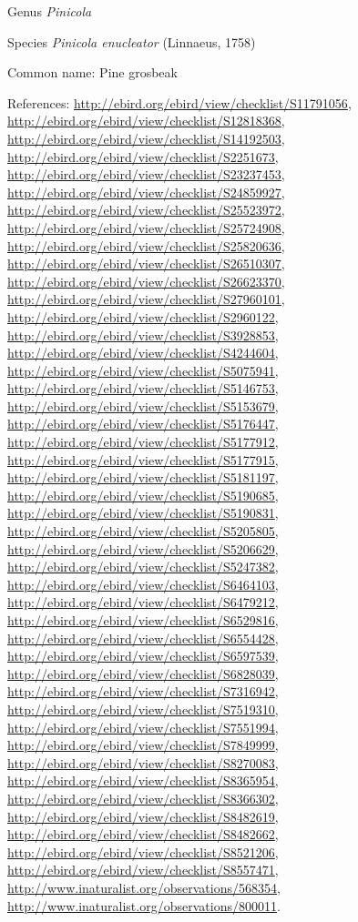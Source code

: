 \documentclass[9pt, article]{memoir}
\begin{document}
\begin{multicols}{2}
\vspace{6pt}\noindent\hspace{30pt}Genus \textit{Pinicola}


\vspace{6pt}\noindent\hspace{36pt}Species \textit{Pinicola enucleator} (Linnaeus, 1758)


Common name: Pine grosbeak

References: 
\url{http://ebird.org/ebird/view/checklist/S11791056}, 
\url{http://ebird.org/ebird/view/checklist/S12818368}, 
\url{http://ebird.org/ebird/view/checklist/S14192503}, 
\url{http://ebird.org/ebird/view/checklist/S2251673}, 
\url{http://ebird.org/ebird/view/checklist/S23237453}, 
\url{http://ebird.org/ebird/view/checklist/S24859927}, 
\url{http://ebird.org/ebird/view/checklist/S25523972}, 
\url{http://ebird.org/ebird/view/checklist/S25724908}, 
\url{http://ebird.org/ebird/view/checklist/S25820636}, 
\url{http://ebird.org/ebird/view/checklist/S26510307}, 
\url{http://ebird.org/ebird/view/checklist/S26623370}, 
\url{http://ebird.org/ebird/view/checklist/S27960101}, 
\url{http://ebird.org/ebird/view/checklist/S2960122}, 
\url{http://ebird.org/ebird/view/checklist/S3928853}, 
\url{http://ebird.org/ebird/view/checklist/S4244604}, 
\url{http://ebird.org/ebird/view/checklist/S5075941}, 
\url{http://ebird.org/ebird/view/checklist/S5146753}, 
\url{http://ebird.org/ebird/view/checklist/S5153679}, 
\url{http://ebird.org/ebird/view/checklist/S5176447}, 
\url{http://ebird.org/ebird/view/checklist/S5177912}, 
\url{http://ebird.org/ebird/view/checklist/S5177915}, 
\url{http://ebird.org/ebird/view/checklist/S5181197}, 
\url{http://ebird.org/ebird/view/checklist/S5190685}, 
\url{http://ebird.org/ebird/view/checklist/S5190831}, 
\url{http://ebird.org/ebird/view/checklist/S5205805}, 
\url{http://ebird.org/ebird/view/checklist/S5206629}, 
\url{http://ebird.org/ebird/view/checklist/S5247382}, 
\url{http://ebird.org/ebird/view/checklist/S6464103}, 
\url{http://ebird.org/ebird/view/checklist/S6479212}, 
\url{http://ebird.org/ebird/view/checklist/S6529816}, 
\url{http://ebird.org/ebird/view/checklist/S6554428}, 
\url{http://ebird.org/ebird/view/checklist/S6597539}, 
\url{http://ebird.org/ebird/view/checklist/S6828039}, 
\url{http://ebird.org/ebird/view/checklist/S7316942}, 
\url{http://ebird.org/ebird/view/checklist/S7519310}, 
\url{http://ebird.org/ebird/view/checklist/S7551994}, 
\url{http://ebird.org/ebird/view/checklist/S7849999}, 
\url{http://ebird.org/ebird/view/checklist/S8270083}, 
\url{http://ebird.org/ebird/view/checklist/S8365954}, 
\url{http://ebird.org/ebird/view/checklist/S8366302}, 
\url{http://ebird.org/ebird/view/checklist/S8482619}, 
\url{http://ebird.org/ebird/view/checklist/S8482662}, 
\url{http://ebird.org/ebird/view/checklist/S8521206}, 
\url{http://ebird.org/ebird/view/checklist/S8557471}, 
\url{http://www.inaturalist.org/observations/568354}, 
\url{http://www.inaturalist.org/observations/800011}.


\end{multicols}
\end{document}
